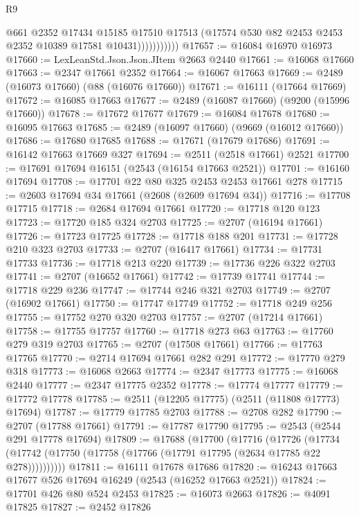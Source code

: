 \begin{lexlean}{R9}
\begin{coremodule}
                        @661
                        @2352
                        @17434
                        @15185
                        @17510
                        @17513
                        (@17574 @530 @82 @2453 @2453 @2352 @10389 @17581 @10431)))))))))))
@17657 := @16084 @16970 @16973
@17660 := LexLeanStd.Json.Json.JItem @2663 @2440
@17661 := @16068 @17660
@17663 := @2347 @17661 @2352
@17664 := @16067 @17663
@17669 := @2489 (@16073 @17660) (@88 (@16076 @17660))
@17671 := @16111 (@17664 @17669)
@17672 := @16085 @17663
@17677 := @2489 (@16087 @17660) (@9200 (@15996 @17660))
@17678 := @17672 @17677
@17679 := @16084 @17678
@17680 := @16095 @17663
@17685 := @2489 (@16097 @17660) (@9669 (@16012 @17660))
@17686 := @17680 @17685
@17688 := @17671 (@17679 @17686)
@17691 := @16142 @17663 @17669 @327
@17694 := @2511 (@2518 @17661) @2521
@17700 := @17691 @17694 @16151 (@2543 (@16154 @17663 @2521))
@17701 := @16160 @17694
@17708 := @17701 @22 @80 @325 @2453 @2453 @17661 @278
@17715 := @2603 @17694 @34 @17661 (@2608 (@2609 @17694 @34))
@17716 := @17708 @17715
@17718 := @2684 @17694 @17661
@17720 := @17718 @120 @123
@17723 := @17720 @185 @324 @2703
@17725 := @2707 (@16194 @17661)
@17726 := @17723 @17725
@17728 := @17718 @188 @201
@17731 := @17728 @210 @323 @2703
@17733 := @2707 (@16417 @17661)
@17734 := @17731 @17733
@17736 := @17718 @213 @220
@17739 := @17736 @226 @322 @2703
@17741 := @2707 (@16652 @17661)
@17742 := @17739 @17741
@17744 := @17718 @229 @236
@17747 := @17744 @246 @321 @2703
@17749 := @2707 (@16902 @17661)
@17750 := @17747 @17749
@17752 := @17718 @249 @256
@17755 := @17752 @270 @320 @2703
@17757 := @2707 (@17214 @17661)
@17758 := @17755 @17757
@17760 := @17718 @273 @63
@17763 := @17760 @279 @319 @2703
@17765 := @2707 (@17508 @17661)
@17766 := @17763 @17765
@17770 := @2714 @17694 @17661 @282 @291
@17772 := @17770 @279 @318
@17773 := @16068 @2663
@17774 := @2347 @17773
@17775 := @16068 @2440
@17777 := @2347 @17775 @2352
@17778 := @17774 @17777
@17779 := @17772 @17778
@17785 := @2511 (@12205 @17775) (@2511 (@11808 @17773) @17694)
@17787 := @17779 @17785 @2703
@17788 := @2708 @282
@17790 := @2707 (@17788 @17661)
@17791 := @17787 @17790
@17795 := @2543 (@2544 @291 @17778 @17694)
@17809 := @17688
    (@17700
      (@17716
        (@17726
          (@17734 (@17742 (@17750 (@17758 (@17766 (@17791 @17795 (@2634 @17785 @22 @278))))))))))
@17811 := @16111 @17678 @17686
@17820 := @16243 @17663 @17677 @526 @17694 @16249 (@2543 (@16252 @17663 @2521))
@17824 := @17701 @426 @80 @524 @2453
@17825 := @16073 @2663
@17826 := @4091 @17825
@17827 := @2452 @17826

\end{coremodule}
\end{lexlean}
